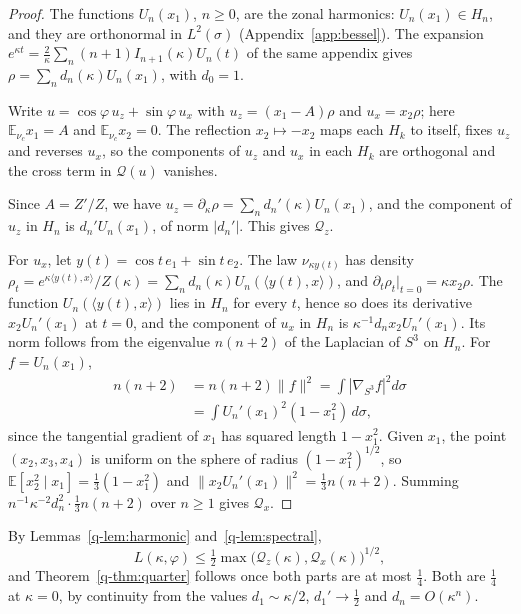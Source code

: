 \documentclass[11pt]{amsart}
\theoremstyle{definition}
\theoremstyle{remark}
\numberwithin{equation}{section}
\newcommand{\E}{\mathbb{E}}
\newcommand{\ip}[2]{\langle #1,#2\rangle}
\begin{document}
\begin{proof}
The functions $U_n(x_1)$, $n\ge0$, are the zonal harmonics: $U_n(x_1)\in
H_n$, and they are orthonormal in $L^2(\sigma)$ (Appendix~\ref{app:bessel}).
The expansion $e^{\kappa t}=\frac2\kappa\sum_n(n+1)I_{n+1}(\kappa)U_n(t)$ of
the same appendix gives $\rho=\sum_nd_n(\kappa)U_n(x_1)$, with $d_0=1$.

Write $u=\cos\varphi\,u_z+\sin\varphi\,u_x$ with $u_z=(x_1-A)\rho$ and
$u_x=x_2\rho$; here $\E_{\nu_c}x_1=A$ and $\E_{\nu_c}x_2=0$. The reflection
$x_2\mapsto-x_2$ maps each $H_k$ to itself, fixes $u_z$ and reverses $u_x$,
so the components of $u_z$ and $u_x$ in each $H_k$ are orthogonal and the
cross term in $\mathcal Q(u)$ vanishes.

Since $A=Z'/Z$, we have $u_z=\partial_\kappa\rho=\sum_nd_n'(\kappa)U_n(x_1)$,
and the component of $u_z$ in $H_n$ is $d_n'U_n(x_1)$, of norm $|d_n'|$. This
gives $\mathcal Q_z$.

For $u_x$, let $y(t)=\cos t\,e_1+\sin t\,e_2$. The law $\nu_{\kappa y(t)}$ has
density $\rho_t=e^{\kappa\ip{y(t)}x}/Z(\kappa)=\sum_nd_n(\kappa)U_n(\ip{y(t)}x)$,
and $\partial_t\rho_t|_{t=0}=\kappa x_2\rho$. The function
$U_n(\ip{y(t)}x)$ lies in $H_n$ for every $t$, hence so does its derivative
$x_2U_n'(x_1)$ at $t=0$, and the component of $u_x$ in $H_n$ is
$\kappa^{-1}d_nx_2U_n'(x_1)$. Its norm follows from the eigenvalue
$n(n+2)$ of the Laplacian of $S^3$ on $H_n$. For $f=U_n(x_1)$,
\[
\begin{aligned}
n(n+2)&=n(n+2)\|f\|^2=\int|\nabla_{S^3}f|^2d\sigma\\
&=\int U_n'(x_1)^2(1-x_1^2)\,d\sigma ,
\end{aligned}
\]
since the tangential gradient of $x_1$ has squared length $1-x_1^2$. Given
$x_1$, the point $(x_2,x_3,x_4)$ is uniform on the sphere of radius
$(1-x_1^2)^{1/2}$, so $\E[x_2^2\mid x_1]=\frac13(1-x_1^2)$ and
$\|x_2U_n'(x_1)\|^2=\frac13n(n+2)$. Summing $n^{-1}\kappa^{-2}d_n^2\cdot\frac13
n(n+2)$ over $n\ge1$ gives $\mathcal Q_x$.
\end{proof}

By Lemmas~\ref{q-lem:harmonic} and~\ref{q-lem:spectral},
\begin{equation}\label{q-eq:Lbyq}
L(\kappa,\varphi)\le\tfrac12\max\bigl(\mathcal Q_z(\kappa),\mathcal Q_x(
\kappa)\bigr)^{1/2},
\end{equation}
and Theorem~\ref{q-thm:quarter} follows once both parts are at most
$\frac14$. Both are $\frac14$ at $\kappa=0$, by continuity from the values
$d_1\sim\kappa/2$, $d_1'\to\frac12$ and $d_n=O(\kappa^n)$.
\end{document}
